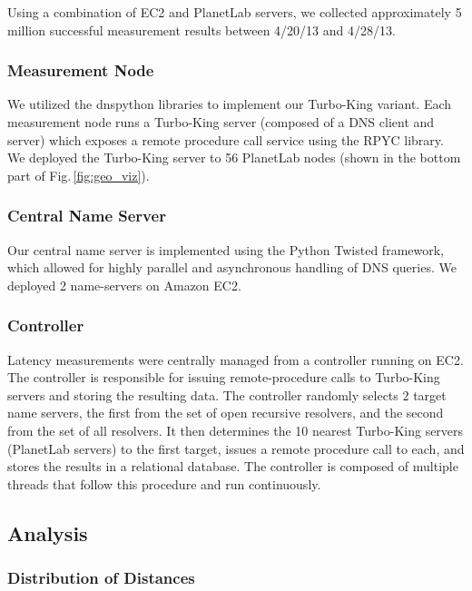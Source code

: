 Using a combination of EC2 and PlanetLab servers, we collected approximately 5 million successful measurement results between 4/20/13 and 4/28/13.

\subsubsection{Measurement Node}
We utilized the dnspython libraries to implement our Turbo-King variant. Each measurement node runs a Turbo-King server (composed of a DNS client and server) which exposes a remote procedure call service using the RPYC library. We deployed the Turbo-King server to 56 PlanetLab nodes (shown in the bottom part of Fig.\,\ref{fig:geo_viz}).

\subsubsection{Central Name Server}
Our central name server is implemented using the Python Twisted framework, which allowed for highly parallel and asynchronous handling of DNS queries. We deployed 2 name-servers on Amazon EC2.

\subsubsection{Controller}
Latency measurements were centrally managed from a controller running on EC2. The controller is responsible for issuing remote-procedure calls to Turbo-King servers and storing the resulting data. The controller randomly selects 2 target name servers, the first from the set of open recursive resolvers, and the second from the set of all resolvers. It then determines the 10 nearest Turbo-King servers (PlanetLab servers) to the first target, issues a remote procedure call to each, and stores the results in a relational database. The controller is composed of multiple threads that follow this procedure and run continuously.

\subsection{Analysis}
\label{sec:analysis}

\subsubsection{Distribution of Distances}

